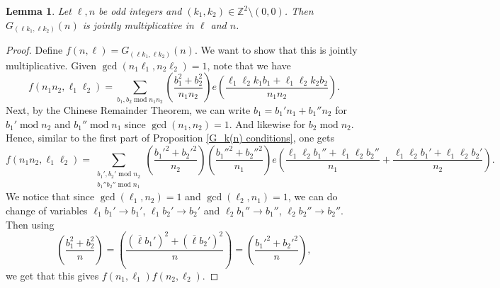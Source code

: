 \documentclass[12pt]{amsart}
\def\Z{\mathbb{Z}}
\newtheorem{lemma}[theorem]{Lemma}
\def\Z{\mathbb Z}
\def\Z{\mathbb Z}
\def\mod{\operatorname{mod}}
\def\gcd{\operatorname{gcd}}
\begin{document}
\begin{lemma}\label{jointlymultiplicative}
    Let $\ell,n$ be odd integers and $(k_1,k_2)\in\Z^2\setminus (0,0)$. Then $G_{(\ell k_1,\ell k_2)}(n)$ is jointly multiplicative in $\ell$ and $n$. 
\end{lemma}
\begin{proof}
    Define $f(n, \ell) = G_{(\ell k_1, \ell k_2)}(n)$. We want to show that this is jointly multiplicative. Given $\gcd(n_1\ell_1 , n_2 \ell_2)=1$, note that we have
    $$ f(n_1n_2, \ell_1 \ell_2) = \sum_{b_1, b_2 \mod n_1n_2} \left(\frac{b_1^2+b_2^2}{n_1n_2} \right) e\left( \frac{\ell_1 \ell_2 k_1 b_1 + \ell_1 \ell_2 k_2 b_2}{n_1n_2} \right). $$
    Next, by the Chinese Remainder Theorem, we can write $b_1 = b_1' n_1 + b_1'' n_2$ for $b_1' \mod n_2$ and $b_1'' \mod n_1$ since $\gcd(n_1,n_2)=1$. And likewise for $b_2 \mod n_2$. Hence, similar to the first part of Proposition \ref{G_k(n) conditions}, one gets
    $$ f(n_1n_2, \ell_1 \ell_2) = \sum_{\substack{b_1', b_2' \mod n_2 \\ b_1'' b_2'' \mod n_1}} \left(\frac{b_1'^2+b_2'^2}{n_2} \right) \left(\frac{b_1''^2+b_2''^2}{n_1} \right) e\left( \frac{\ell_1\ell_2 b_1'' + \ell_1\ell_2 b_2''}{n_1} + \frac{\ell_1\ell_2b_1'+ \ell_1\ell_2 b_2'}{n_2} \right) . $$
    We notice that since $\gcd(\ell_1 , n_2)=1$ and $\gcd(\ell_2, n_1)=1$, we can do change of variables $\ell_1 b_1' \to b_1'$, $\ell_1 b_2' \to b_2'$ and $\ell_2 b_1'' \to b_1''$, $\ell_2 b_2'' \to b_2''$. Then using $$\left( \frac{b_1^2+b_2^2}{n} \right) = \left( \frac{(\overline{\ell}b_1')^2+(\overline{\ell}b_2')^2}{n} \right) =\left( \frac{b_1'^2+b_2'^2}{n} \right),  $$ we get that this gives $f(n_1, \ell_1)f(n_2,\ell_2)$.
\end{proof}
\end{document}
